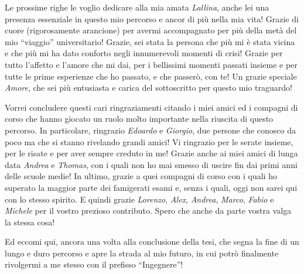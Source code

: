 \begin{acknowledgements}
  Le prossime righe le voglio dedicare alla mia amata \emph{Lallina}, anche lei una presenza essenziale in questo mio percorso e ancor di più nella mia vita! Grazie di cuore (rigorosamente arancione) per avermi accompagnato per più della metà del mio ``viaggio'' universitario! Grazie, sei stata la persona che più mi è stata vicina e che più mi ha dato conforto negli innumerevoli momenti di crisi! Grazie per tutto l'affetto e l'amore che mi dai, per i bellissimi momenti passati insieme e per tutte le prime esperienze che ho passato, e che passerò, con te! Un grazie speciale \emph{Amore}, che sei più entusiasta e carica del sottoscritto per questo mio traguardo!

  Vorrei concludere questi cari ringraziamenti citando i miei amici ed i compagni di corso che hanno giocato un ruolo molto importante nella riuscita di questo percorso.
  In particolare, ringrazio \emph{Edoardo} e \emph{Giorgio}, due persone che conosco da poco ma che si stanno rivelando grandi amici! Vi ringrazio per le serate insieme, per le risate e per aver sempre creduto in me! Grazie anche ai miei amici di lunga data \emph{Andrea} e \emph{Thomas}, con i quali non ho mai smesso di uscire fin dai primi anni delle scuole medie! In ultimo, grazie a quei compagni di corso con i quali ho superato la maggior parte dei famigerati esami e, senza i quali, oggi non sarei qui con lo stesso spirito. E quindi grazie \emph{Lorenzo}, \emph{Alex}, \emph{Andrea}, \emph{Marco}, \emph{Fabio} e \emph{Michele} per il vostro prezioso contributo. Spero che anche da parte vostra valga la stessa cosa!

  Ed eccomi qui, ancora una volta alla conclusione della tesi, che segna la fine di un lungo e duro percorso e apre la strada al mio futuro, in cui potrò finalmente rivolgermi a me stesso con il prefisso ``Ingegnere''!
\end{acknowledgements}
